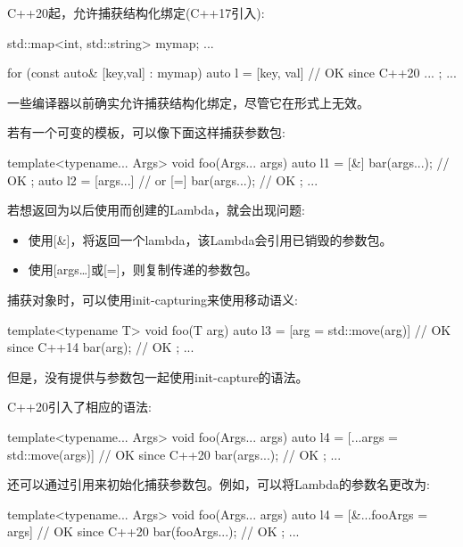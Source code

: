 
C++20起，允许捕获结构化绑定(C++17引入):

\begin{cpp}
std::map<int, std::string> mymap;
...

for (const auto& [key,val] : mymap) {
	auto l = [key, val] { // OK since C++20
				...
			};
	...
}
\end{cpp}

一些编译器以前确实允许捕获结构化绑定，尽管它在形式上无效。


若有一个可变的模板，可以像下面这样捕获参数包:

\begin{cpp}
template<typename... Args>
void foo(Args... args)
{
	auto l1 = [&] {
					bar(args...); // OK
				};
	auto l2 = [args...] { // or [=]
					bar(args...); // OK
				};
	...
}
\end{cpp}

若想返回为以后使用而创建的Lambda，就会出现问题:

\begin{itemize}
\item
使用[\&]，将返回一个lambda，该Lambda会引用已销毁的参数包。

\item
使用[args…]或[=]，则复制传递的参数包。
\end{itemize}

捕获对象时，可以使用init-capturing来使用移动语义:

\begin{cpp}
template<typename T>
void foo(T arg)
{
	auto l3 = [arg = std::move(arg)] { // OK since C++14
				bar(arg); // OK
			};
	...
}
\end{cpp}

但是，没有提供与参数包一起使用init-capture的语法。

C++20引入了相应的语法:

\begin{cpp}
template<typename... Args>
void foo(Args... args)
{
	auto l4 = [...args = std::move(args)] { // OK since C++20
				bar(args...); // OK
			};
	...
}
\end{cpp}

还可以通过引用来初始化捕获参数包。例如，可以将Lambda的参数名更改为:

\begin{cpp}
template<typename... Args>
void foo(Args... args)
{
	auto l4 = [&...fooArgs = args] { // OK since C++20
				bar(fooArgs...); // OK
			};
	...
}
\end{cpp}

